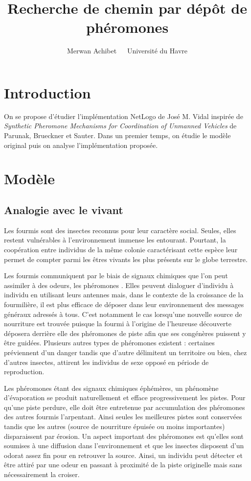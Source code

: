 \documentclass[12pt]{article}
\title{Recherche de chemin par dépôt de phéromones}
\author{Merwan Achibet $\;$ \textendash $\;$ Université du Havre}
\date{}
\begin{document}
\maketitle

\section*{Introduction}

On se propose d'étudier l'implémentation NetLogo de José M. Vidal
inspirée de \textit{Synthetic Pheromone Mechanisms for Coordination of
  Unmanned Vehicles} de Parunak, Brueckner et Sauter. Dans un premier
temps, on étudie le modèle original puis on analyse l'implémentation
proposée.

\section{Modèle}

\subsection{Analogie avec le vivant}

Les fourmis sont des insectes reconnus pour leur caractère
social. Seules, elles restent vulnérables à l'environnement immense
les entourant. Pourtant, la coopération entre individus de la même
colonie caractérisant cette espèce leur permet de compter parmi les
êtres vivants les plus présents sur le globe terrestre.

Les fourmis communiquent par le biais de signaux chimiques que l'on
peut assimiler à des odeurs, les phéromones \cite{insectes}. Elles
peuvent dialoguer d'individu à individu en utilisant leurs antennes
mais, dans le contexte de la croissance de la fourmilière, il est plus
efficace de déposer dans leur environnement des messages généraux
adressés à tous. C'est notamment le cas lorsqu'une nouvelle source de
nourriture est trouvée puisque la fourmi à l'origine de l'heureuse
découverte déposera derrière elle des phéromones de piste afin que ses
congénères puissent y être guidées. Plusieurs autres types de
phéromones existent : certaines préviennent d'un danger tandis que
d'autre délimitent un territoire ou bien, chez d'autres insectes,
attirent les individus de sexe opposé en période de reproduction.

Les phéromones étant des signaux chimiques éphémères, un phénomène
d'évaporation se produit naturellement et efface progressivement les
pistes.  Pour qu'une piste perdure, elle doit être entretenue par
accumulation des phéromones des autres fourmis l'arpentant. Ainsi
seules les meilleures pistes sont conservées tandis que les autres
(source de nourriture épuisée ou moins importantes) disparaissent par
érosion.  Un aspect important des phéromones est qu'elles sont
soumises à une diffusion dans l'environnement et que les insectes
disposent d'un odorat assez fin pour en retrouver la source. Ainsi, un
individu peut détecter et être attiré par une odeur en passant à
proximité de la piste originelle mais sans nécessairement la croiser.
\end{document}
